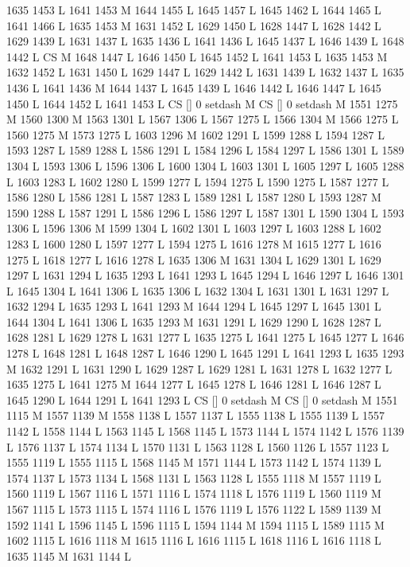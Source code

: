 {{{{{{{{{{{{{{{{{{{{{{{{{{{1635 1453 L
1641 1453 M 1644 1455 L
1645 1457 L
1645 1462 L
1644 1465 L
1641 1466 L
1635 1453 M 1631 1452 L
1629 1450 L
1628 1447 L
1628 1442 L
1629 1439 L
1631 1437 L
1635 1436 L
1641 1436 L
1645 1437 L
1646 1439 L
1648 1442 L
CS M
1648 1447 L
1646 1450 L
1645 1452 L
1641 1453 L
1635 1453 M 1632 1452 L
1631 1450 L
1629 1447 L
1629 1442 L
1631 1439 L
1632 1437 L
1635 1436 L
1641 1436 M 1644 1437 L
1645 1439 L
1646 1442 L
1646 1447 L
1645 1450 L
1644 1452 L
1641 1453 L
CS [] 0 setdash M
CS [] 0 setdash M
1551 1275 M 1560 1300 M 1563 1301 L
1567 1306 L
1567 1275 L
1566 1304 M 1566 1275 L
1560 1275 M 1573 1275 L
1603 1296 M 1602 1291 L
1599 1288 L
1594 1287 L
1593 1287 L
1589 1288 L
1586 1291 L
1584 1296 L
1584 1297 L
1586 1301 L
1589 1304 L
1593 1306 L
1596 1306 L
1600 1304 L
1603 1301 L
1605 1297 L
1605 1288 L
1603 1283 L
1602 1280 L
1599 1277 L
1594 1275 L
1590 1275 L
1587 1277 L
1586 1280 L
1586 1281 L
1587 1283 L
1589 1281 L
1587 1280 L
1593 1287 M 1590 1288 L
1587 1291 L
1586 1296 L
1586 1297 L
1587 1301 L
1590 1304 L
1593 1306 L
1596 1306 M 1599 1304 L
1602 1301 L
1603 1297 L
1603 1288 L
1602 1283 L
1600 1280 L
1597 1277 L
1594 1275 L
1616 1278 M 1615 1277 L
1616 1275 L
1618 1277 L
1616 1278 L
1635 1306 M 1631 1304 L
1629 1301 L
1629 1297 L
1631 1294 L
1635 1293 L
1641 1293 L
1645 1294 L
1646 1297 L
1646 1301 L
1645 1304 L
1641 1306 L
1635 1306 L
1632 1304 L
1631 1301 L
1631 1297 L
1632 1294 L
1635 1293 L
1641 1293 M 1644 1294 L
1645 1297 L
1645 1301 L
1644 1304 L
1641 1306 L
1635 1293 M 1631 1291 L
1629 1290 L
1628 1287 L
1628 1281 L
1629 1278 L
1631 1277 L
1635 1275 L
1641 1275 L
1645 1277 L
1646 1278 L
1648 1281 L
1648 1287 L
1646 1290 L
1645 1291 L
1641 1293 L
1635 1293 M 1632 1291 L
1631 1290 L
1629 1287 L
1629 1281 L
1631 1278 L
1632 1277 L
1635 1275 L
1641 1275 M 1644 1277 L
1645 1278 L
1646 1281 L
1646 1287 L
1645 1290 L
1644 1291 L
1641 1293 L
CS [] 0 setdash M
CS [] 0 setdash M
1551 1115 M 1557 1139 M 1558 1138 L
1557 1137 L
1555 1138 L
1555 1139 L
1557 1142 L
1558 1144 L
1563 1145 L
1568 1145 L
1573 1144 L
1574 1142 L
1576 1139 L
1576 1137 L
1574 1134 L
1570 1131 L
1563 1128 L
1560 1126 L
1557 1123 L
1555 1119 L
1555 1115 L
1568 1145 M 1571 1144 L
1573 1142 L
1574 1139 L
1574 1137 L
1573 1134 L
1568 1131 L
1563 1128 L
1555 1118 M 1557 1119 L
1560 1119 L
1567 1116 L
1571 1116 L
1574 1118 L
1576 1119 L
1560 1119 M 1567 1115 L
1573 1115 L
1574 1116 L
1576 1119 L
1576 1122 L
1589 1139 M 1592 1141 L
1596 1145 L
1596 1115 L
1594 1144 M 1594 1115 L
1589 1115 M 1602 1115 L
1616 1118 M 1615 1116 L
1616 1115 L
1618 1116 L
1616 1118 L
1635 1145 M 1631 1144 L
}}}}}}}}}}}}}}}}}}}}}}}}}}}
